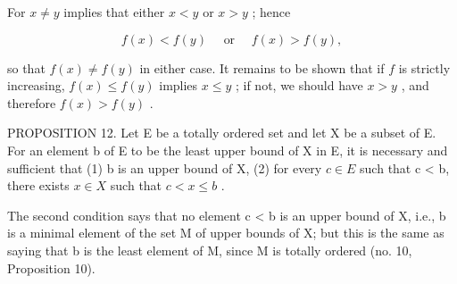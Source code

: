 For \(x \neq y\) implies that either \(x < y\) or \(x > y\) ; hence

\[
f (x) <   f (y) \quad \text { or } \quad f (x) > f (y),
\]

so that \(f(x) \neq f(y)\) in either case. It remains to be shown that if \(f\) is strictly increasing, \(f(x) \leqslant f(y)\) implies \(x \leqslant y\) ; if not, we should have \(x > y\) , and therefore \(f(x) > f(y)\) .

PROPOSITION 12. Let E be a totally ordered set and let X be a subset of E. For an element b of E to be the least upper bound of X in E, it is necessary and sufficient that (1) b is an upper bound of X, (2) for every \(c \in E\) such that c \textless{} b, there exists \(x \in X\) such that \(c < x \leqslant b\) .

The second condition says that no element c \textless{} b is an upper bound of X, i.e., b is a minimal element of the set M of upper bounds of X; but this is the same as saying that b is the least element of M, since M is totally ordered (no. 10, Proposition 10).

